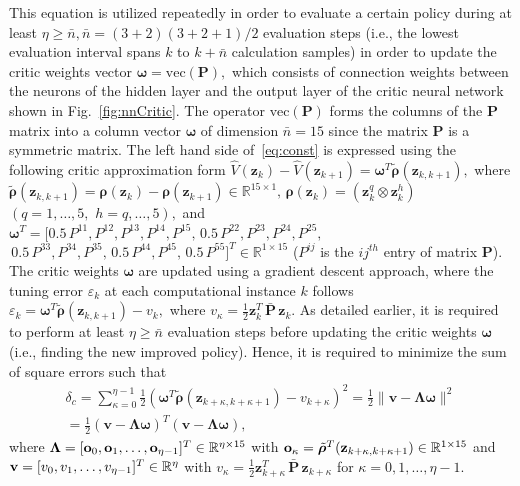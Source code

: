 \documentclass[letterpaper]{article} %
\begin{document}
%
This equation is utilized repeatedly in order to evaluate a certain policy during at least $\eta\ge \bar n, \bar n= (3+2)(3+2+1)/2$ evaluation steps (i.e., the lowest evaluation interval spans $k$ to $k+\bar n$ calculation samples) in order to update the critic weights vector  $\boldsymbol{\omega}=\mathrm{vec}(\mathbf{P}),$ which consists of connection weights between the neurons of the hidden layer and the output layer of the critic neural network shown in Fig.~\eqref{fig:nnCritic}. The operator $\mathrm{vec}(\mathbf{P})$ forms the columns of the $\mathbf{P}$ matrix into a column vector $\mathbf{\omega}$ of dimension $\bar{n}=15$ since the matrix $\mathbf{P}$ is a symmetric matrix. The left hand side of~\eqref{eq:const} is expressed using the following critic approximation form %
%
$\hat{V}(\mathbf{z}_k)-\hat{V}(\mathbf{z}_{k+1})=\boldsymbol{\omega}^T\tilde{\bm{\rho}}(\mathbf{z}_{k,k+1}),$ %
%
where $\tilde{\bm{\rho}}(\mathbf{z}_{k,k+1})=\bm{\rho}(\mathbf{z}_k)-\bm{\rho}(\mathbf{z}_{k+1}) \in \mathbb{R}^{15 \times 1}, \, \bm{\rho}(\mathbf{z}_k)=\left(\mathbf{z}^q_k\otimes\mathbf{z}^h_k\right)$ $(q=1,\dots, 5, \,\, h=q,\dots,5),$ and $\boldsymbol{\omega}^T = [0.5 \, P^{11},P^{12},P^{13},P^{14}, P^{15}, \, 0.5 \, P^{22}, P^{23},P^{24},P^{25},$ $\,0.5 \, P^{33}, P^{34},P^{35},\,0.5 \, P^{44},P^{45}, \,0.5 \, P^{55}]^T \in \mathbb{R}^{1\times 15}$ ($P^{ij}$ is the $ij^{th}$ entry of matrix $\mathbf{P}$). %
%
The critic weights $\boldsymbol{\omega}$ are updated using a gradient descent approach, where the tuning error $\varepsilon_k$ at each computational instance $k$ follows $\varepsilon_k =\boldsymbol{\omega}^T\tilde{\bm{\rho}}(\mathbf{z}_{k,k+1})-{v}_k,$ where $v_\kappa = \frac{1}{2}\mathbf{z}_{k}^T \, \bar{\mathbf{P}} \, \mathbf{z}_{k}$. As detailed earlier, it is required to perform at least $\eta \ge \bar n$ evaluation steps before updating the critic weights $\boldsymbol{\omega}$ (i.e., finding the new improved policy). Hence, it is required to minimize the sum of square errors such that %
%
\begin{multline*}
  \delta_c =\sum_{\kappa=0}^{\eta-1}\frac{1}{2}(\boldsymbol{\omega}^T\tilde{\bm{\rho}}(\mathbf{z}_{k+\kappa,k+\kappa+1})-{v}_{k+\kappa})^2 = \frac{1}{2}\| \mathbf{v} - \bm{\Lambda}\bm{\omega}\|^2\\
  =\frac{1}{2}\left(\mathbf{v} - \bm{\Lambda}\bm{\omega}\right)^T \left(\mathbf{v} - \bm{\Lambda}\bm{\omega}\right), 
\end{multline*}
where $\bm{\Lambda} = [{\bf o}_0,{\bf o}_1,\ldots,{\bf o}_{\eta-1}]^T \in \mathbb{R}^{\eta\times 15}$ with ${\bf o}_\kappa = \tilde{\bm{\rho}}^T({\bf z}_{k+\kappa, k+\kappa+1}) \in \mathbb{R}^{1\times 15}$ and ${\bf v} =[v_0,v_1,\ldots,v_{\eta-1}]^T \in \mathbb{R}^{\eta}$ with $v_\kappa = \frac{1}{2}\mathbf{z}_{k+\kappa}^T \, \bar{\mathbf{P}} \, \mathbf{z}_{k+\kappa}$ for $\kappa = 0,1,\ldots, \eta-1$. %
\end{document}

